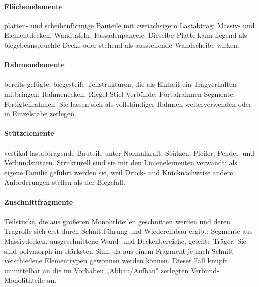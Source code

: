 \documentclass[type=zwischenbericht]{zukunftbau}
\begin{document}
\begin{SemioNest}
\begin{SemioNest}
\paragraph{Flächenelemente}
platten- und scheibenförmige Bauteile mit zweiachsigem Lastabtrag: Massiv- und Elementdecken, Wandtafeln, Fassadenpaneele. Dieselbe Platte kann liegend als biegebeanspruchte Decke oder stehend als aussteifende Wandscheibe wirken.

\paragraph{Rahmenelemente}
bereits gefügte, biegesteife Teilstrukturen, die als Einheit ein Tragverhalten mitbringen: Rahmenecken, Riegel-Stiel-Verbünde, Portalrahmen-Segmente, Fertigteilrahmen. Sie lassen sich als vollständiger Rahmen weiterverwenden oder in Einzelstäbe zerlegen.

\paragraph{Stützelemente}
vertikal lastabtragende Bauteile unter Normalkraft: Stützen, Pfeiler, Pendel- und Verbundstützen. Strukturell sind sie mit den Linienelementen verwandt; als eigene Familie geführt werden sie, weil Druck- und Knicknachweise andere Anforderungen stellen als der Biegefall.

\paragraph{Zuschnittfragmente}
Teilstücke, die aus größeren Monolithteilen geschnitten werden und deren Tragrolle sich erst durch Schnittführung und Wiedereinbau ergibt: Segmente aus Massivdecken, ausgeschnittene Wand- und Deckenbereiche, geteilte Träger. Sie sind polymorph im stärksten Sinn, da aus einem Fragment je nach Schnitt verschiedene Elementtypen gewonnen werden können. Dieser Fall knüpft unmittelbar an die im Vorhaben „Abbau/Aufbau" zerlegten Verbund-Monolithteile an.
\end{SemioNest}
\end{SemioNest}
\end{document}
